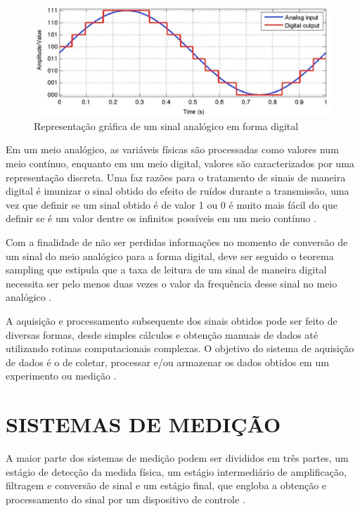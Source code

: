 \begin{figure}[htb]
	\caption{\label{fig:1120} Representação gráfica de um sinal analógico em forma digital}
	\begin{center}
		\includegraphics[width=\textwidth]{pictures/1120.png}
	\end{center}
\end{figure}

Em um meio analógico, as variáveis físicas são processadas como valores num meio contínuo, enquanto em um meio digital, valores são caracterizados por uma representação
discreta. Uma faz razões para o tratamento de sinais de maneira digital é imunizar o sinal obtido do efeito de ruídos durante a transmissão, uma vez que definir se um sinal
obtido é de valor 1 ou 0 é muito mais fácil do que definir se é um valor dentre os infinitos possíveis em um meio contínuo \autocite{Hollman2011}.

Com a finalidade de não ser perdidas informações no momento de conversão de um sinal do meio analógico para a forma digital, deve ser seguido o teorema sampling que estipula
que a taxa de leitura de um sinal de maneira digital necessita ser pelo menos duas vezes o valor da frequência desse sinal no meio analógico \autocite{Hollman2011}.

A aquisição e processamento subsequente dos sinais obtidos pode ser feito de diversas formas, desde simples cálculos e obtenção manuais de dados até utilizando
rotinas computacionais complexas. O objetivo do sistema de aquisição de dados é o de coletar, processar e/ou armazenar os dados obtidos em um experimento ou medição
\autocite{Hollman2011}.

\section{SISTEMAS DE MEDIÇÃO}

A maior parte dos sistemas de medição podem ser divididos em três partes, um estágio de detecção da medida física, um estágio intermediário de amplificação, filtragem
e conversão de sinal e um estágio final, que engloba a obtenção e processamento do sinal por um dispositivo de controle \autocite{Hollman2011}.

